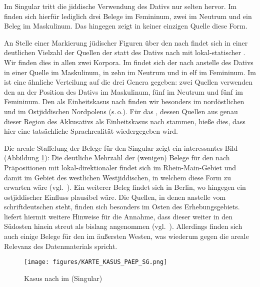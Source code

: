 Im Singular tritt die jiddische Verwendung des Dativs nur selten hervor. Im  finden sich hierfür lediglich drei Belege im Femininum, zwei im Neutrum und ein Beleg im Maskulinum. Das  hingegen zeigt in keiner einzigen Quelle diese Form.

An Stelle einer Markierung jüdischer Figuren über den  nach  findet sich in einer deutlichen Vielzahl der Quellen der  statt des Dativs nach  mit lokal-statischer . Wir finden dies in allen zwei Korpora. Im  findet sich der  nach  anstelle des Dativs in einer Quelle im Maskulinum, in zehn im Neutrum und in elf im Femininum. Im  ist eine ähnliche Verteilung auf die drei Genera gegeben: zwei Quellen verwenden den  an der Position des Dativs im Maskulinum, fünf im Neutrum und fünf im Femininum. Den  als Einheitskasus nach  finden wir besonders im nordöstlichen  und im Ostjiddischen Nordpolens (s.\,o.). Für das , dessen Quellen aus genau dieser Region des Akkusativs als Einheitskasus nach  stammen, hieße dies, dass hier eine tatsächliche Sprachrealität wiedergegeben wird. 

 
Die areale Staffelung der Belege für den Singular zeigt ein interessantes Bild (Abbildung \ref{kartepaepSG}): Die deutliche Mehrzahl der (wenigen) Belege für den  nach Präpositionen mit lokal-direktionaler  findet sich im Rhein-Main-Gebiet und damit im Gebiet des westlichen Westjiddischen, in welchem diese Form zu erwarten wäre (vgl.\, \citealt{FleischerSchaefer2012}). Ein weiterer Beleg 
findet sich in %
Berlin, wo hingegen ein ostjiddischer Einfluss plausibel wäre. Die Quellen, in denen  anstelle vom schriftdeutschen  steht, finden sich besonders im Osten des Erhebungsgebiets.  liefert hiermit weitere Hinweise für die Annahme, dass dieser  weiter in den Südosten hinein streut als bislang angenommen (vgl.\, \citealt{FleischerSchaefer2012}). Allerdings finden sich auch einige Belege für den  im äußersten Westen, was wiederum gegen die areale Relevanz des Datenmaterials spricht.

 \begin{figure}[t]
\texttt{[image: figures/KARTE\_KASUS\_PAEP\_SG.png]}
\caption{\label{kartepaepSG} Kasus nach  im  (Singular)}
\end{figure}  
 
